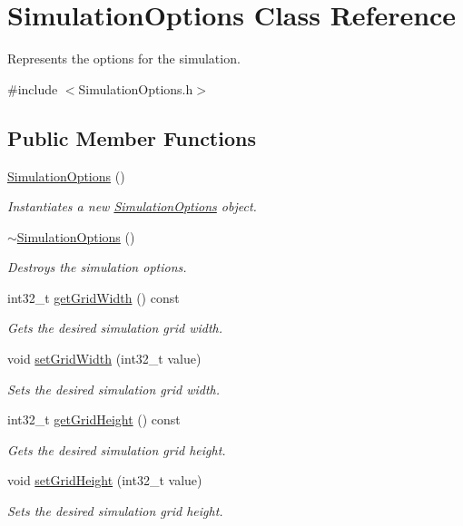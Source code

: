 \hypertarget{class_simulation_options}{}\section{Simulation\+Options Class Reference}
\label{class_simulation_options}


Represents the options for the simulation.  




{\ttfamily \#include $<$Simulation\+Options.\+h$>$}

\subsection*{Public Member Functions}
\begin{DoxyCompactItemize}
\item 
\mbox{\hyperlink{class_simulation_options_a05056945c8434dcdfc5ab9d28a82f0f8}{Simulation\+Options}} ()
\begin{DoxyCompactList}\small\item\em Instantiates a new \mbox{\hyperlink{class_simulation_options}{Simulation\+Options}} object. \end{DoxyCompactList}\item 
\mbox{\hyperlink{class_simulation_options_a1b2b2c848788b91de4925da6a6a023ee}{$\sim$\+Simulation\+Options}} ()
\begin{DoxyCompactList}\small\item\em Destroys the simulation options. \end{DoxyCompactList}\item 
int32\+\_\+t \mbox{\hyperlink{class_simulation_options_adafceb9beefbc495dc1f79acfb7f44f5}{get\+Grid\+Width}} () const
\begin{DoxyCompactList}\small\item\em Gets the desired simulation grid width. \end{DoxyCompactList}\item 
void \mbox{\hyperlink{class_simulation_options_a0e99477f144c4d44c9f1eff1d1791b70}{set\+Grid\+Width}} (int32\+\_\+t value)
\begin{DoxyCompactList}\small\item\em Sets the desired simulation grid width. \end{DoxyCompactList}\item 
int32\+\_\+t \mbox{\hyperlink{class_simulation_options_a233c90f94e5a966bc4e06fda8449a8d8}{get\+Grid\+Height}} () const
\begin{DoxyCompactList}\small\item\em Gets the desired simulation grid height. \end{DoxyCompactList}\item 
void \mbox{\hyperlink{class_simulation_options_a61fb0af11a55e3cc7c5a6aab84c2a676}{set\+Grid\+Height}} (int32\+\_\+t value)
\begin{DoxyCompactList}\small\item\em Sets the desired simulation grid height. \end{DoxyCompactList}\end{DoxyCompactItemize}


